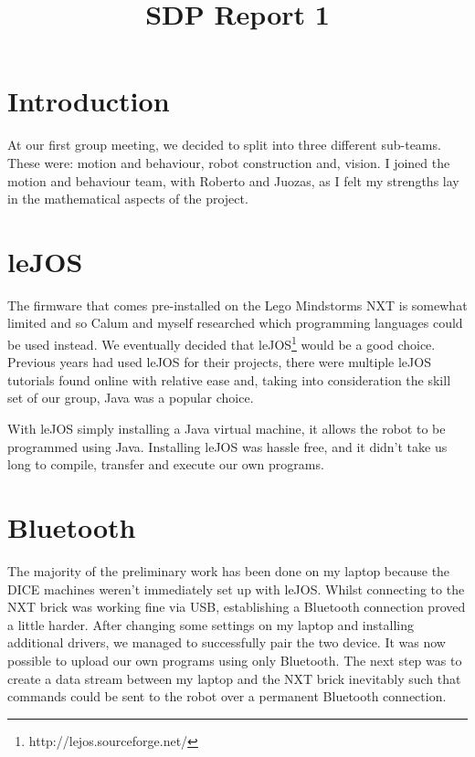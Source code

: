 \documentclass[conference,12pt]{IEEEtran}
\begin{document}
	
\title{SDP Report 1}

\author{
}
	
\maketitle

\IEEEpeerreviewmaketitle
	
\section{Introduction}
At our first group meeting, we decided to split into three different sub-teams. These were: motion and behaviour, robot construction and, vision. I joined the motion and behaviour team, with Roberto and Juozas, as I felt my strengths lay in the mathematical aspects of the project. 
	
\section{leJOS}
The firmware that comes pre-installed on the Lego Mindstorms NXT is somewhat limited and so Calum and myself researched which programming languages could be used instead. We eventually decided that leJOS\footnote{http://lejos.sourceforge.net/} would be a good choice. Previous years had used leJOS for their projects, there were multiple leJOS tutorials found online with relative ease and, taking into consideration the skill set of our group, Java was a popular choice.

With leJOS simply installing a Java virtual machine, it allows the robot to be programmed using Java. Installing leJOS was hassle free, and it didn't take us long to compile, transfer and execute our own programs.

	
\section{Bluetooth}	
The majority of the preliminary work has been done on my laptop because the DICE machines weren't immediately set up with leJOS. Whilst connecting to the NXT brick was working fine via USB, establishing a Bluetooth connection proved a little harder. After changing some settings on my laptop and installing additional drivers, we managed to successfully pair the two device. It was now possible to upload our own programs using only Bluetooth. The next step was to create a data stream between my laptop and the NXT brick inevitably such that commands could be sent to the robot over a permanent Bluetooth connection.
\end{document}
